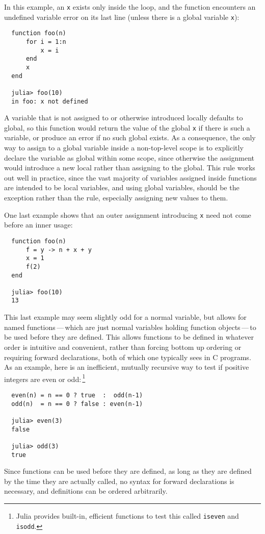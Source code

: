 \documentclass{article}
\begin{document}
In this example, an \verb|x| exists only inside the loop, and
the function encounters an undefined variable error on its last line
(unless there is a global variable \verb|x|):
\begin{verbatim}
  function foo(n)
      for i = 1:n
          x = i
      end
      x
  end

  julia> foo(10)
  in foo: x not defined
\end{verbatim}
A variable that is not assigned to or otherwise introduced locally defaults to global,
so this function would return the value of the global \verb|x|
if there is such a variable, or produce an error if no such global exists.
As a consequence, the only way to assign to a global variable inside
a non-top-level scope is to explicitly declare the variable as global within some scope, since
otherwise the assignment would introduce a new local rather than assigning to the global. This rule works out
well in practice, since the vast majority of variables assigned inside
functions are intended to be local variables, and using global variables, should be the exception rather than the rule, especially assigning new values to them.

One last example shows that an outer assignment introducing \verb|x| need not come before an inner usage:
\begin{verbatim}
  function foo(n)
      f = y -> n + x + y
      x = 1
      f(2)
  end

  julia> foo(10)
  13
\end{verbatim}
This last example may seem slightly odd for a normal variable, but allows for named functions\,---\,which are just normal variables holding function objects\,---\,to be used before they are defined.
This allows functions to be defined in whatever order is intuitive and convenient, rather than forcing bottom up ordering or requiring forward declarations, both of which one typically sees in C programs.
As an example, here is an inefficient, mutually recursive way to test if positive integers are even or odd:\,\footnote{Julia provides built-in, efficient functions to test this called \texttt{iseven} and \texttt{isodd}.}
\begin{verbatim}
  even(n) = n == 0 ? true  :  odd(n-1)
  odd(n)  = n == 0 ? false : even(n-1)

  julia> even(3)
  false

  julia> odd(3)
  true
\end{verbatim}
Since functions can be used before they are defined, as long as they are defined by the time they are actually called, no syntax for forward declarations is necessary, and definitions can be ordered arbitrarily.
\end{document}
